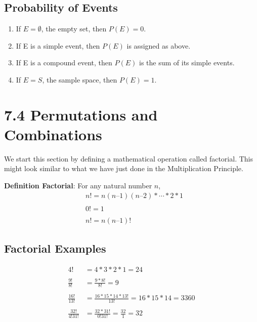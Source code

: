 \documentclass[14pt]{extarticle}
\begin{document}
\subsection{Probability of Events}
\begin{tcolorbox}[enhanced jigsaw,colback=bg,boxrule=0pt,arc=0pt] 
	\begin{enumerate}
		\item If $E=\emptyset$, the empty set, then $P(E)=0$.
		\item If E is a simple event, then $P(E)$ is assigned as above.
		\item If E is a compound event, then $P(E)$ is the sum of its simple events.
		\item If $E=S$, the sample space, then $P(E)=1$.
	\end{enumerate}
\end{tcolorbox}


\section*{7.4 Permutations and Combinations}
We start this section by defining a mathematical operation called factorial. This might look similar to what we have just done in the Multiplication Principle.
\begin{tcolorbox}[enhanced jigsaw,colback=bg,boxrule=0pt,arc=0pt] 
	\textbf{Definition Factorial}:
	For any natural number $n$, 
	\begin{align*}
		&n! = n(n – 1)(n – 2)*\cdots*2*1   \\
		\\
		&0! = 1 \\
		\\
		&n! = n(n – 1)!
	\end{align*}
\end{tcolorbox}
\subsection{Factorial Examples}
\begin{align*}
	4! &= 4*3*2*1 = 24 \\\\
	\frac{9!}{8!} &= \frac{9*8!}{8!} = 9 \\\\
	\frac{16!}{13!} &= \frac{16*15*14*13!}{13!}= 16*15*14 = 3360 \\\\
	\frac{32!}{4!31!} &= \frac{32*31!}{0!31!}= \frac{32}{1} = 32
\end{align*}
\end{document}

